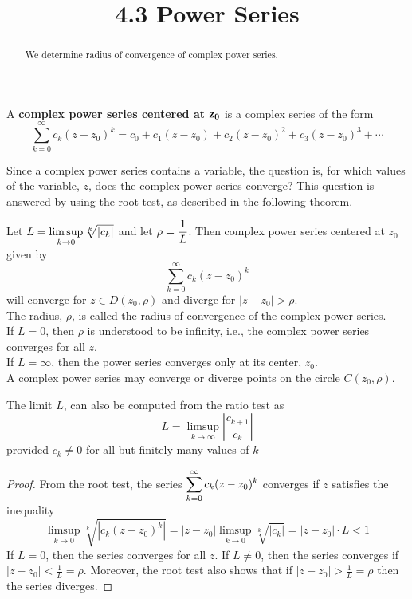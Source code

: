 \documentclass[handout]{ximera}
\title{4.3 Power Series}
\begin{document}
\begin{abstract}
We determine radius of convergence of complex power series.
\end{abstract}

\maketitle


\begin{definition} 
A {\bf complex power series centered at} ${\bf z_0}$ is a complex series of the form
\[
\sum_{k=0}^\infty c_k(z-z_0)^k = c_0 + c_1 (z-z_0) + c_2 (z-z_0)^2 + c_3 (z-z_0)^3 + \cdots
\]
\end{definition}
Since a complex power series contains a variable, the question is, for which values of the variable, $z$, 
does the complex power series converge? This question is answered by using the root test, as described in the following theorem.

\begin{theorem}
Let $\displaystyle L = \limsup_{k \to 0} \sqrt[k]{|c_k|}$ and let $\displaystyle \rho = \frac{1}{L}$.
Then complex power series centered at $z_0$ given by
\[
\sum_{k=0}^\infty c_k(z-z_0)^k
\]
will converge for 
$z \in D(z_0, \rho)$ and diverge for $|z-z_0| > \rho$.\\
The radius, $\rho$, is called the radius of convergence of the complex power series.\\
If $L = 0$, then $\rho$ is understood to be infinity, i.e., the complex power series converges for all $z$.\\
If $L = \infty$, then the power series converges only at its center, $z_0$.\\
A complex power series may converge or diverge points on the circle $C(z_0, \rho)$.
\end{theorem}
\begin{remark}
The limit $L$, can also be computed from the ratio test as 
\[
L = \limsup_{k \to \infty} \left|\frac{c_{k+1}}{c_k}\right|
\]
provided $c_k \neq 0$ for all but finitely many values of $k$
\end{remark}


\begin{proof}
From the root test, the series  $\displaystyle \sum_{k=0}^\infty c_k(z-z_0)^k$ converges if $z$ satisfies the inequality
\[
\limsup_{k \to 0} \sqrt[k]{|c_k(z-z_0)^k|} = |z-z_0| \limsup_{k \to 0} \sqrt[k]{|c_k|} = |z-z_0| \cdot L < 1
\]
If $L =0$, then the series converges for all $z$. If $L \neq 0$, then the series converges if $|z-z_0| < \frac{1}{L} = \rho$.
Moreover, the root test also shows that if $|z-z_0|  > \frac{1}{L} = \rho$ then the series diverges.
\end{proof}
\end{document}

